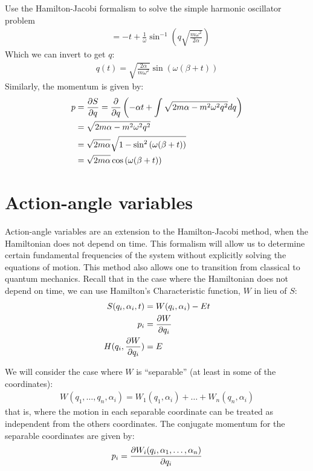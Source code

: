 \begin{example}{0pt}{Use the Hamilton-Jacobi formalism to solve the simple harmonic oscillator problem}{}
\begin{align*}
&=-t+\frac{1}{\omega}\sin^{-1}\left(q\sqrt{\frac{m\omega^2}{2\alpha}}  \right)
\end{align*}
Which we can invert to get $q$:
\begin{align*}
q(t)=\sqrt{\frac{2\alpha}{m\omega^2}}\sin\left(\omega(\beta+t)\right)
\end{align*}
Similarly, the momentum is given by:
\begin{align*}
p&=\frac{\partial S}{\partial q}=\frac{\partial }{\partial q}\left(-\alpha t+\int \sqrt{2m\alpha-m^2\omega^2q^2}dq\right)\\
&=\sqrt{2m\alpha-m^2\omega^2q^2}\\
&=\sqrt{2m\alpha}\sqrt{1-\sin^2\left(\omega(\beta+t)\right)}\\
&=\sqrt{2m\alpha}\cos\left(\omega(\beta+t)\right)
\end{align*}
\end{example}

\section{Action-angle variables}
Action-angle variables are an extension to the Hamilton-Jacobi method, when the Hamiltonian does not depend on time. This formalism will allow us to determine certain fundamental frequencies of the system without explicitly solving the equations of motion. This method also allows one to transition from classical to quantum mechanics. Recall that in the case where the Hamiltonian does not depend on time, we can use Hamilton's Characteristic function, $W$ in lieu of $S$:
\begin{align}
S(q_i,\alpha_i,t)&=W(q_i,\alpha_i)-Et\nonumber\\
p_i&=\frac{\partial W}{\partial q_i}\nonumber\\
H(q_i,\frac{\partial W}{\partial q_i})&=E
\end{align}

We will consider the case where $W$ is ``separable'' (at least in some of the coordinates):
\begin{align}
W(q_1,\dots, q_n,\alpha_i)=W_1(q_1,\alpha_i)+\dots +W_n(q_n,\alpha_i)
\end{align}
that is, where the motion in each separable coordinate can be treated as independent from the others coordinates. The conjugate momentum for the separable coordinates are given by:
\begin{align}
p_i&=\frac{\partial W_i(q_i, \alpha_1, \dots , \alpha_n)}{\partial q_i}\nonumber\\
\end{align}

